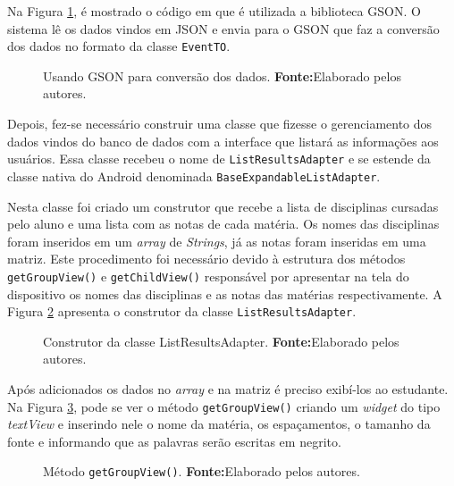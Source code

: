 	\par Na Figura \ref{fig:app11}, é mostrado o código em que é utilizada a
	biblioteca GSON. O sistema lê os dados vindos em JSON e envia para o GSON que faz a conversão dos
dados no formato da classe \texttt{EventTO}.

	\begin{figure}[h!] 
		
		\caption[Usando GSON para conversão dos dados]{Usando GSON para conversão dos dados.
		\textbf{Fonte:}Elaborado pelos autores.}
		\label{fig:app11}
	\end{figure}
	
	\par Depois, fez-se necessário construir uma classe que fizesse o gerenciamento
dos dados vindos do banco de dados com a interface que listará as informações
aos usuários. Essa classe recebeu o nome de \texttt{ListResultsAdapter} e se
estende da classe nativa do Android denominada
\texttt{BaseExpandableListAdapter}.

	\par Nesta classe foi criado um construtor que recebe a lista de disciplinas
cursadas pelo aluno e uma lista com as notas de cada matéria. Os nomes das
disciplinas foram inseridos em um \textit{array} de \textit{Strings}, já as
notas foram inseridas em uma matriz. Este procedimento foi necessário devido à
estrutura dos métodos \texttt{getGroupView()} e \texttt{getChildView()}
responsável por apresentar na tela do dispositivo os nomes das disciplinas e as
notas das matérias respectivamente.  A Figura \ref{fig:app12} apresenta o
construtor da classe \texttt{ListResultsAdapter}.

	\begin{figure}[h!] 
		
		\caption[Construtor da classe ListResultsAdapter]{Construtor da classe ListResultsAdapter.
		\textbf{Fonte:}Elaborado pelos autores.}
		\label{fig:app12}
	\end{figure}

	\par Após adicionados os dados no \textit{array} e na matriz é preciso
	exibí-los ao estudante. Na Figura \ref{fig:app13}, pode se ver o método \texttt{getGroupView()}
criando um \textit{widget} do tipo \textit{textView}  e inserindo nele o nome
da matéria, os espaçamentos, o tamanho da fonte e informando que as palavras
serão escritas em negrito.

	\begin{figure}[h!] 
		
		\caption[Método getGroupView()]{Método \texttt{getGroupView()}.
		\textbf{Fonte:}Elaborado pelos autores.}
		\label{fig:app13}
	\end{figure}
	
